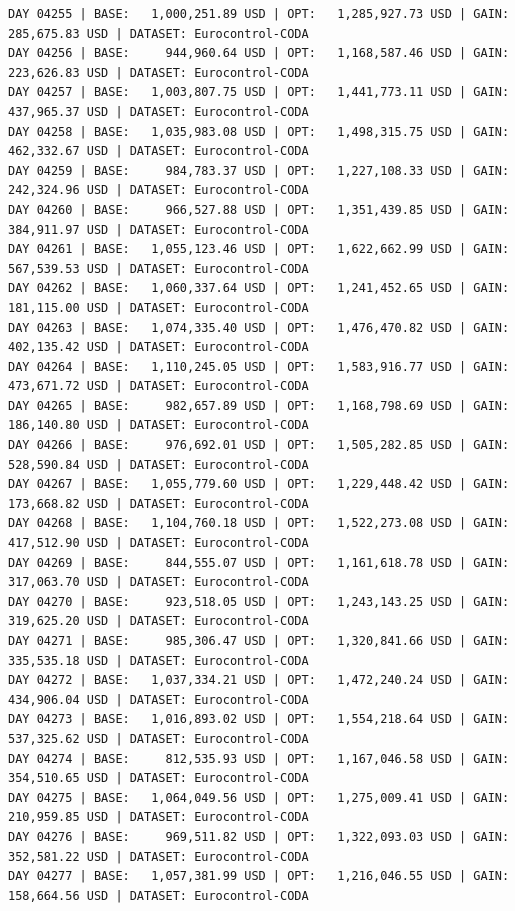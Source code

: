 \documentclass[11pt,a4paper]{article}
\begin{document}
\begin{verbatim}
DAY 04255 | BASE:   1,000,251.89 USD | OPT:   1,285,927.73 USD | GAIN: 285,675.83 USD | DATASET: Eurocontrol-CODA
DAY 04256 | BASE:     944,960.64 USD | OPT:   1,168,587.46 USD | GAIN: 223,626.83 USD | DATASET: Eurocontrol-CODA
DAY 04257 | BASE:   1,003,807.75 USD | OPT:   1,441,773.11 USD | GAIN: 437,965.37 USD | DATASET: Eurocontrol-CODA
DAY 04258 | BASE:   1,035,983.08 USD | OPT:   1,498,315.75 USD | GAIN: 462,332.67 USD | DATASET: Eurocontrol-CODA
DAY 04259 | BASE:     984,783.37 USD | OPT:   1,227,108.33 USD | GAIN: 242,324.96 USD | DATASET: Eurocontrol-CODA
DAY 04260 | BASE:     966,527.88 USD | OPT:   1,351,439.85 USD | GAIN: 384,911.97 USD | DATASET: Eurocontrol-CODA
DAY 04261 | BASE:   1,055,123.46 USD | OPT:   1,622,662.99 USD | GAIN: 567,539.53 USD | DATASET: Eurocontrol-CODA
DAY 04262 | BASE:   1,060,337.64 USD | OPT:   1,241,452.65 USD | GAIN: 181,115.00 USD | DATASET: Eurocontrol-CODA
DAY 04263 | BASE:   1,074,335.40 USD | OPT:   1,476,470.82 USD | GAIN: 402,135.42 USD | DATASET: Eurocontrol-CODA
DAY 04264 | BASE:   1,110,245.05 USD | OPT:   1,583,916.77 USD | GAIN: 473,671.72 USD | DATASET: Eurocontrol-CODA
DAY 04265 | BASE:     982,657.89 USD | OPT:   1,168,798.69 USD | GAIN: 186,140.80 USD | DATASET: Eurocontrol-CODA
DAY 04266 | BASE:     976,692.01 USD | OPT:   1,505,282.85 USD | GAIN: 528,590.84 USD | DATASET: Eurocontrol-CODA
DAY 04267 | BASE:   1,055,779.60 USD | OPT:   1,229,448.42 USD | GAIN: 173,668.82 USD | DATASET: Eurocontrol-CODA
DAY 04268 | BASE:   1,104,760.18 USD | OPT:   1,522,273.08 USD | GAIN: 417,512.90 USD | DATASET: Eurocontrol-CODA
DAY 04269 | BASE:     844,555.07 USD | OPT:   1,161,618.78 USD | GAIN: 317,063.70 USD | DATASET: Eurocontrol-CODA
DAY 04270 | BASE:     923,518.05 USD | OPT:   1,243,143.25 USD | GAIN: 319,625.20 USD | DATASET: Eurocontrol-CODA
DAY 04271 | BASE:     985,306.47 USD | OPT:   1,320,841.66 USD | GAIN: 335,535.18 USD | DATASET: Eurocontrol-CODA
DAY 04272 | BASE:   1,037,334.21 USD | OPT:   1,472,240.24 USD | GAIN: 434,906.04 USD | DATASET: Eurocontrol-CODA
DAY 04273 | BASE:   1,016,893.02 USD | OPT:   1,554,218.64 USD | GAIN: 537,325.62 USD | DATASET: Eurocontrol-CODA
DAY 04274 | BASE:     812,535.93 USD | OPT:   1,167,046.58 USD | GAIN: 354,510.65 USD | DATASET: Eurocontrol-CODA
DAY 04275 | BASE:   1,064,049.56 USD | OPT:   1,275,009.41 USD | GAIN: 210,959.85 USD | DATASET: Eurocontrol-CODA
DAY 04276 | BASE:     969,511.82 USD | OPT:   1,322,093.03 USD | GAIN: 352,581.22 USD | DATASET: Eurocontrol-CODA
DAY 04277 | BASE:   1,057,381.99 USD | OPT:   1,216,046.55 USD | GAIN: 158,664.56 USD | DATASET: Eurocontrol-CODA

\end{verbatim}
\end{document}
